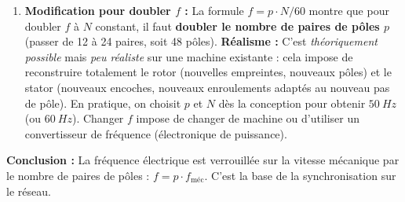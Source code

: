 \documentclass[11pt]{article}
\begin{document}
\begin{exoresolu}
\begin{enumerate}
    \item \textbf{Modification pour doubler $f$ :}
    La formule $f = p \cdot N/60$ montre que pour doubler $f$ à $N$ constant, il faut \textbf{doubler le nombre de paires de pôles $p$} (passer de 12 à 24 paires, soit 48 pôles).
    \textbf{Réalisme :} C'est \emph{théoriquement possible} mais \emph{peu réaliste} sur une machine existante : cela impose de reconstruire totalement le rotor (nouvelles empreintes, nouveaux pôles) et le stator (nouveaux encoches, nouveaux enroulements adaptés au nouveau pas de pôle). En pratique, on choisit $p$ et $N$ dès la conception pour obtenir $\SI{50}{Hz}$ (ou $\SI{60}{Hz}$). Changer $f$ impose de changer de machine ou d'utiliser un convertisseur de fréquence (électronique de puissance).
\end{enumerate}
\par\medskip\noindent\textbf{Conclusion :} La fréquence électrique est verrouillée sur la vitesse mécanique par le nombre de paires de pôles : $f = p \cdot f_{\text{méc}}$. C'est la base de la synchronisation sur le réseau.
\end{exoresolu}
\end{document}
